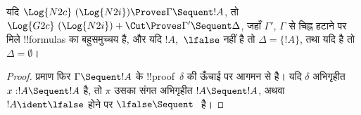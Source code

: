 \documentclass[../../../include/open-logic-section]{subfiles}
\begin{document}


\begin{prop} यदि $\Log{N2c}\ (\Log{N2i}) \Proves
\Gamma \Sequent !A$, तो $\Log{G2c}\ (\Log{N2i}) + \Cut \Proves \Gamma'
\Sequent \Delta$, जहाँ $\Gamma'$, $\Gamma$ से चिह्न हटाने पर मिले
!!{formula}s का बहुसमुच्चय है, और यदि $!A$,~$\lfalse$ नहीं है तो $\Delta =
\{!A\}$, तथा यदि है तो $\Delta = \emptyset$।
\end{prop}

\begin{proof}
प्रमाण फिर $\Gamma \Sequent !A$ के !!{proof}~$\delta$ की ऊँचाई पर आगमन से
है। यदि $\delta$ अभिगृहीत $x:!A \Sequent !A$ है, तो $\pi$ उसका संगत अभिगृहीत
$!A \Sequent !A$, अथवा $!A \ident \lfalse$ होने पर $\lfalse \Sequent \ $
है।


\end{proof}
\end{document}
